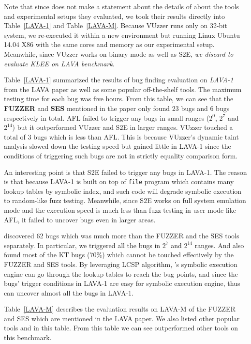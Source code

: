 Note that since \cite{dolan2016lava} does not make a statement about the details of 
about the tools and experimental setups they evaluated, we took their results
directly into Table~\ref{LAVA-1} and Table~\ref{LAVA-M}. 
Because VUzzer runs only on 32-bit system, 
we re-executed it within a new environment but running Linux Ubuntu 14.04 X86 
with the same cores and memory as our experimental setup. Meanwhile, since VUzzer
works on binary mode as well as S2E, \emph{we discard to evaluate KLEE on LAVA benchmark}.

Table~\ref{LAVA-1} summarized the results of bug finding evaluation on 
\textit{LAVA-1} from the LAVA paper as well as some popular off-the-shelf 
tools. The maximum testing time for each bug was five hours. 
From this table, we can see that the \textbf{FUZZER} and \textbf{SES} 
mentioned in the paper only found 23 bugs and 6 bugs respectively in total. 
AFL failed to trigger any bugs in small ranges ($2^0$, $2^7$ and $2^{14}$) 
but it outperformed VUzzer and S2E in larger ranges. 
VUzzer touched a total of 3 bugs which is less than AFL. 
This is because VUzzer's dynamic taint analysis slowed down
the testing speed but gained little in LAVA-1 since the conditions of triggering
such bugs are not in strictly equality comparison form.

An interesting point is that S2E failed to trigger any bugs in LAVA-1. The reason
is that because LAVA-1 is built on top of \texttt{file} program which contains many
lookup tables by symbolic index, and such code will degrade symbolic execution
to random-like fuzz testing. Meanwhile, since S2E works on full system emulation mode and the execution speed is much less than fuzz testing in user mode like AFL, it failed
to uncover bugs even in larger areas.

\prototype discovered 62 bugs which was much more than the FUZZER and the 
SES tools separately. In particular, we triggered all the bugs in $2^7$ and 
$2^{14}$ ranges. And also found most of the KT bugs (70\%) which cannot be 
touched effectively by the FUZZER and SES tools. By leveraging LCSP algorithm,
\prototype's symbolic execution engine can go through the lookup tables to reach
the bug points, and since the bugs' trigger conditions in LAVA-1 are easy for symbolic 
execution engine, \prototype thus can uncover almost all the bugs in LAVA-1.

Table~\ref{LAVA-M} describes the evaluation results on LAVA-M of the FUZZER 
and SES which are mentioned in the LAVA paper. We also listed other popular
tools and \prototype in this table. From this table we can see \prototype
outperformed other tools on this benchmark.

